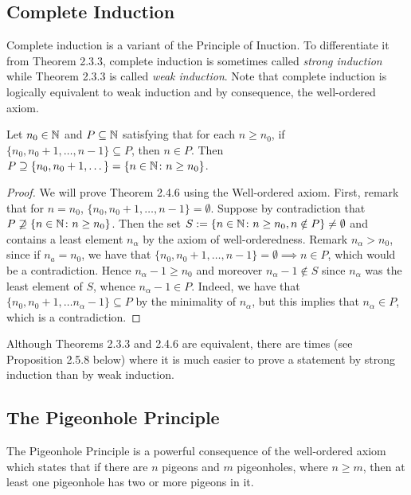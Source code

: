 \subsection{Complete Induction}

Complete induction is a variant of the Principle of Inuction. To differentiate it from Theorem 2.3.3, complete induction is sometimes called \textit{strong induction} while Theorem 2.3.3 is called \textit{weak induction}. Note that complete induction is logically equivalent to weak induction and by consequence, the well-ordered axiom. 

\begin{thmbox}
   Let $n_0 \in \mathbb{N}$ and $P \subseteq \mathbb{N}$ satisfying that for each $n \geq n_0$, if $\{n_0, n_0 + 1, \dots, n - 1\} \subseteq P$, then $n \in P$. Then $P \supseteq \{n_0, n_0 + 1, \dots \} = \{n \in \mathbb{N} \colon n \geq n_0\}$. 
\end{thmbox}

\begin{proof}
   We will prove Theorem 2.4.6 using the Well-ordered axiom. First, remark that for $n = n_0$, $\{n_0, n_0 + 1, \dots, n - 1\} = \emptyset$.  Suppose by contradiction that $P \not\supseteq \{n \in \mathbb{N} \colon n \geq n_0 \}$. Then the set $S := \{ n \in \mathbb{N} \colon n \geq n_0, n \notin P\} \neq \emptyset$ and contains a least element $n_\alpha$ by the axiom of well-orderedness. 
      Remark $n_\alpha > n_0$, since if $n_a = n_0$, we have that $\{n_0, n_0 + 1, \dots, n - 1 \} = \emptyset \implies n \in P$, which would be a contradiction. Hence $n_\alpha - 1 \geq n_0$ and moreover $n_\alpha - 1 \notin S$ since $n_\alpha$ was the least element of $S$, whence $n_\alpha - 1 \in P$. Indeed, we have that $\{n_0, n_0 + 1, \dots n_\alpha - 1\} \subseteq P$ by the minimality of $n_\alpha$, but this implies that $n_\alpha \in P$, which is a contradiction.
\end{proof}

Although Theorems 2.3.3 and 2.4.6 are equivalent, there are times (see Proposition 2.5.8 below) where it is much easier to prove a statement by strong induction than by weak induction.

\subsection{The Pigeonhole Principle}

The Pigeonhole Principle is a powerful consequence of the well-ordered axiom which states that if there are $n$ pigeons and $m$ pigeonholes, where $n \geq m$, then at least one pigeonhole has two or more pigeons in it. 

